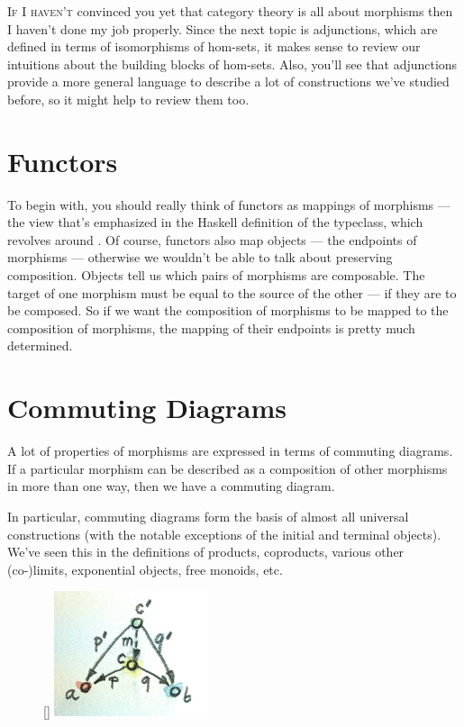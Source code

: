 \lettrine[lhang=0.17]{I}{f I haven't} convinced you yet that category theory is all about
morphisms then I haven't done my job properly. Since the next topic is
adjunctions, which are defined in terms of isomorphisms of hom-sets, it
makes sense to review our intuitions about the building blocks of
hom-sets. Also, you'll see that adjunctions provide a more general
language to describe a lot of constructions we've studied before, so it
might help to review them too.

\section{Functors}

To begin with, you should really think of functors as mappings of
morphisms --- the view that's emphasized in the Haskell definition of
the  typeclass, which revolves around . Of
course, functors also map objects --- the endpoints of morphisms ---
otherwise we wouldn't be able to talk about preserving composition.
Objects tell us which pairs of morphisms are composable. The target of
one morphism must be equal to the source of the other --- if they are to
be composed. So if we want the composition of morphisms to be mapped to
the composition of  morphisms, the mapping of their
endpoints is pretty much determined.

\section{Commuting Diagrams}

A lot of properties of morphisms are expressed in terms of commuting
diagrams. If a particular morphism can be described as a composition of
other morphisms in more than one way, then we have a commuting diagram.

In particular, commuting diagrams form the basis of almost all universal
constructions (with the notable exceptions of the initial and terminal
objects). We've seen this in the definitions of products, coproducts,
various other (co-)limits, exponential objects, free monoids, etc.

\begin{figure}
\raisebox{0pt}[\dimexpr{}\baselineskip\relax]{
\includegraphics[width=1.78125in]{images/productranking.jpg}}%
\end{figure}

